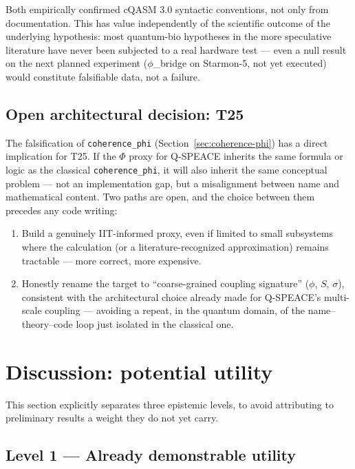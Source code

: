 \documentclass[11pt,a4paper]{article}
\newcommand{\code}[1]{\texttt{#1}}
\newcommand{\coherencephi}{\code{coherence\_phi}}
\newcommand{\starmon}{Starmon-5\xspace}
\begin{document}
Both empirically confirmed cQASM 3.0 syntactic conventions, not only from documentation. This has value independently of the scientific outcome of the underlying hypothesis: most quantum-bio hypotheses in the more speculative literature have never been subjected to a real hardware test --- even a null result on the next planned experiment ($\phi$\_bridge on \starmon, not yet executed) would constitute falsifiable data, not a failure.

\subsection{Open architectural decision: T25}
\label{sec:t25}

The falsification of \coherencephi{} (Section~\ref{sec:coherence-phi}) has a direct implication for T25. If the $\Phi$ proxy for Q-SPEACE inherits the same formula or logic as the classical \coherencephi{}, it will also inherit the same conceptual problem --- not an implementation gap, but a misalignment between name and mathematical content. Two paths are open, and the choice between them precedes any code writing:

\begin{enumerate}
  \item[(a)] Build a genuinely IIT-informed proxy, even if limited to small subsystems where the calculation (or a literature-recognized approximation) remains tractable --- more correct, more expensive.
  \item[(b)] Honestly rename the target to ``coarse-grained coupling signature'' ($\phi$, $S$, $\sigma$), consistent with the architectural choice already made for Q-SPEACE's multi-scale coupling --- avoiding a repeat, in the quantum domain, of the name--theory--code loop just isolated in the classical one.
\end{enumerate}

\section{Discussion: potential utility}
\label{sec:discussion}

This section explicitly separates three epistemic levels, to avoid attributing to preliminary results a weight they do not yet carry.

\subsection{Level 1 --- Already demonstrable utility}
\end{document}
